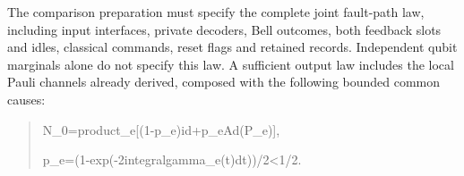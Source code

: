 \documentclass[
]{article}
\begin{document}
The comparison preparation must specify the complete joint fault-path
law, including input interfaces, private decoders, Bell outcomes, both
feedback slots and idles, classical commands, reset flags and retained
records. Independent qubit marginals alone do not specify this law. A
sufficient output law includes the local Pauli channels already derived,
composed with the following bounded common causes:

\begin{quote}\small\ttfamily\raggedright\setlength{\parskip}{0pt}
\noindent N\allowbreak{}\_\allowbreak{}0\allowbreak{}\hspace*{0.525em}\allowbreak{}=\allowbreak{}\hspace*{0.525em}\allowbreak{}p\allowbreak{}r\allowbreak{}o\allowbreak{}d\allowbreak{}u\allowbreak{}c\allowbreak{}t\allowbreak{}\_\allowbreak{}e\allowbreak{}\hspace*{0.525em}\allowbreak{}[\allowbreak{}(\allowbreak{}1\allowbreak{}-\allowbreak{}p\allowbreak{}\_\allowbreak{}e\allowbreak{})\allowbreak{}\hspace*{0.525em}\allowbreak{}i\allowbreak{}d\allowbreak{}\hspace*{0.525em}\allowbreak{}+\allowbreak{}\hspace*{0.525em}\allowbreak{}p\allowbreak{}\_\allowbreak{}e\allowbreak{}\hspace*{0.525em}\allowbreak{}A\allowbreak{}d\allowbreak{}(\allowbreak{}P\allowbreak{}\_\allowbreak{}e\allowbreak{})\allowbreak{}]\allowbreak{},\par
\noindent p\allowbreak{}\_\allowbreak{}e\allowbreak{}\hspace*{0.525em}\allowbreak{}=\allowbreak{}\hspace*{0.525em}\allowbreak{}(\allowbreak{}1\allowbreak{}-\allowbreak{}e\allowbreak{}x\allowbreak{}p\allowbreak{}(\allowbreak{}-\allowbreak{}2\allowbreak{}\hspace*{0.525em}\allowbreak{}i\allowbreak{}n\allowbreak{}t\allowbreak{}e\allowbreak{}g\allowbreak{}r\allowbreak{}a\allowbreak{}l\allowbreak{}\hspace*{0.525em}\allowbreak{}g\allowbreak{}a\allowbreak{}m\allowbreak{}m\allowbreak{}a\allowbreak{}\_\allowbreak{}e\allowbreak{}(\allowbreak{}t\allowbreak{})\allowbreak{}\hspace*{0.525em}\allowbreak{}d\allowbreak{}t\allowbreak{})\allowbreak{})\allowbreak{}/\allowbreak{}2\allowbreak{}\hspace*{0.525em}\allowbreak{}<\allowbreak{}\hspace*{0.525em}\allowbreak{}1\allowbreak{}/\allowbreak{}2\allowbreak{}.\par
\end{quote}
\end{document}

